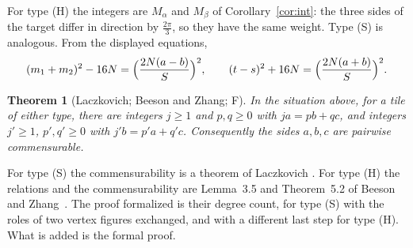 \documentclass[11pt,reqno]{amsart}
\theoremstyle{plain}
\newtheorem{theorem}{Theorem}[section]
\theoremstyle{definition}
\newcommand{\sF}{\textup{\textsf{F}}}
\begin{document}
For type (H) the integers are $M_\alpha$ and $M_\beta$ of Corollary~\ref{cor:int}: the three sides of the
target differ in direction by $\frac{2\pi}3$, so they have the same weight. Type (S) is analogous. From the
displayed equations,
\begin{equation}\label{eq:disc}
(m_1+m_2)^2-16N=\Bigl(\frac{2N(a-b)}S\Bigr)^2,\qquad (t-s)^2+16N=\Bigl(\frac{2N(a+b)}S\Bigr)^2 .
\end{equation}

\begin{theorem}[Laczkovich; Beeson and Zhang; \sF]\label{thm:relations}
In the situation above, for a tile of either type, there are integers $j\ge1$ and $p,q\ge0$ with
$ja=pb+qc$, and integers $j'\ge1$, $p',q'\ge0$ with $j'b=p'a+q'c$. Consequently the sides $a,b,c$ are
pairwise commensurable.
\end{theorem}

For type (S) the commensurability is a theorem of Laczkovich \cite[Thm.~3.3]{Laczkovich2012}. For type (H)
the relations and the commensurability are Lemma~3.5 and Theorem~5.2 of Beeson and Zhang~\cite{BeesonZhang}.
The proof formalized is their degree count, for type (S) with the roles of two vertex figures exchanged, and
with a different last step for type (H). What is added is the formal proof.
\end{document}
